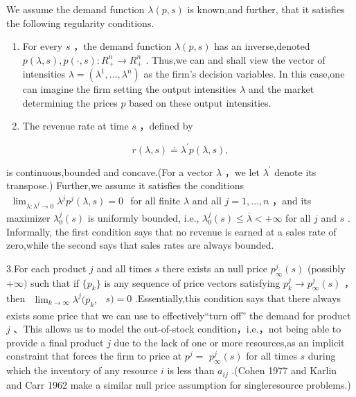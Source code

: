 We assume the demand function \(\lambda ( p , s )\) is known,and further, that it satisfies the following regularity conditions.

\begin{enumerate}
\def\labelenumi{\arabic{enumi}.}
\item
  For every \(s\) ，the demand function \(\lambda ( p , s )\) has an inverse,denoted \(p ( \lambda , s ) , p ( \cdot , s ) \colon R _ { + } ^ { n } \to R _ { + } ^ { n }\) . Thus,we can and shall view the vector of intensities \(\lambda = ( \lambda ^ { 1 } , \ldots , \lambda ^ { n } )\) as the firm's decision variables. In this case,one can imagine the firm setting the output intensities \(\lambda\) and the market determining the prices \(p\) based on these output intensities.
\item
  The revenue rate at time \(s\) ，defined by
\end{enumerate}

\[
r ( \lambda , s ) \doteq \lambda ^ { \prime } p ( \lambda , s ) ,
\]

is continuous,bounded and concave.(For a vector \(\lambda\) ，we let \(\lambda ^ { \prime }\) denote its transpose.) Further,we assume it satisfies the conditions \(\begin{array} { r } { \operatorname* { l i m } _ { \lambda : \lambda ^ { j } \to 0 } \lambda ^ { j } p ^ { j } ( \lambda , s ) = 0 } \end{array}\) for all finite \(\lambda\) and all \(j = 1 , \dotsc , n\) ，and its maximizer \(\lambda _ { 0 } ^ { j } ( s )\) is uniformly bounded, i.e., \(\lambda _ { 0 } ^ { j } ( s ) \leqslant \overline { { \lambda } } < + \infty\) for all \(j\) and \(s\) . Informally, the first condition says that no revenue is earned at a sales rate of zero,while the second says that sales rates are always bounded.

3.For each product \(j\) and all times \(s\) there exists an null price \(p _ { \infty } ^ { j } ( s )\) (possibly \(+ \infty )\) such that if \(\{ p _ { k } \}\) is any sequence of price vectors satisfying \(p _ { k } ^ { j } \to p _ { \infty } ^ { j } ( s )\) ，then \(\begin{array} { r } { \operatorname* { l i m } _ { k \to \infty } \lambda ^ { j } ( p _ { k } , } \end{array}\) \(s ) = 0\) .Essentially,this condition says that there always exists some price that we can use to effectively``turn off'' the demand for product \(j\) 、This allows us to model the out-of-stock condition，i.e.，not being able to provide a final product \(j\) due to the lack of one or more resources,as an implicit constraint that forces the firm to price at \(p ^ { j } =\) \(p _ { \infty } ^ { j } ( s )\) for all times \(s\) during which the inventory of any resource \(i\) is less than \(a _ { i j }\) .(Cohen 1977 and Karlin and Carr 1962 make a similar null price assumption for singleresource problems.)

